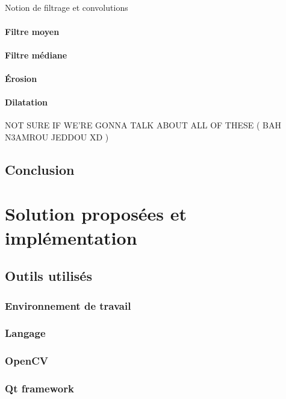 \documentclass[12pt]{report}
\begin{document}
\paragraph{}
Notion de filtrage et convolutions

\subsubsection{Filtre moyen}
\subsubsection{Filtre médiane}
\subsubsection{Érosion}
\subsubsection{Dilatation}

NOT SURE IF WE'RE GONNA TALK ABOUT ALL OF THESE ( BAH N3AMROU JEDDOU XD )

\section{Conclusion}

\chapter{Solution proposées et implémentation}

\section{Outils utilisés}

\subsection{Environnement de travail}
\subsection{Langage}
\subsection{OpenCV}
\subsection{Qt framework}
\end{document}
